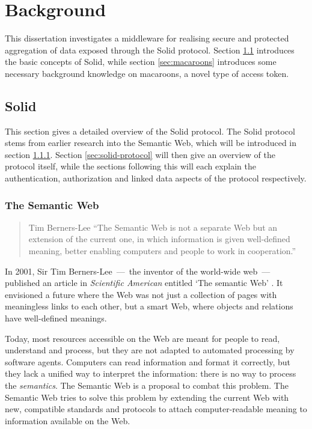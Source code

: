 \chapter{Background}
\label{cha:background}
This dissertation investigates a middleware for realising secure and protected aggregation of data exposed through the Solid protocol. Section \ref{sec:solid} introduces the basic concepts of Solid, while section \ref{sec:macaroons} introduces some necessary background knowledge on macaroons, a novel type of access token.

\section{Solid}
\label{sec:solid}
This section gives a detailed overview of the Solid protocol. The Solid protocol stems from earlier research into the Semantic Web, which will be introduced in section \ref{sec:semantic-web}. Section \ref{sec:solid-protocol} will then give an overview of the protocol itself, while the sections following this will each explain the authentication, authorization and linked data aspects of the protocol respectively.

\subsection{The Semantic Web}
\label{sec:semantic-web}
\begin{quote}{Tim Berners-Lee}
    ``The Semantic Web is not a separate Web but an extension of the current one, in which information is given well-defined meaning, better enabling computers and people to work in cooperation.''
\end{quote}

\noindent In 2001, Sir Tim Berners-Lee \,---\, the inventor of the world-wide web \,---\, published an article in \textit{Scientific American} entitled `The semantic Web' \citep{semantic-web}. It envisioned a future where the Web was not just a collection of pages with meaningless links to each other, but a smart Web, where objects and relations have well-defined meanings.

Today, most resources accessible on the Web are meant for people to read, understand and process, but they are not adapted to automated processing by software agents. Computers can read information and format it correctly, but they lack a unified way to interpret the information: there is no way to process the \textit{semantics}. The Semantic Web is a proposal to combat this problem. The Semantic Web tries to solve this problem by extending the current Web with new, compatible standards and protocols to attach computer-readable meaning to information available on the Web.


